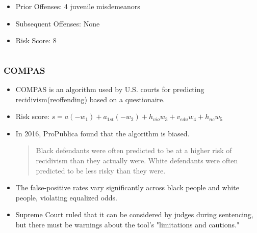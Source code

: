 \documentclass{beamer}
\begin{document}
\begin{frame}
\begin{columns}[T]
\begin{column}{.5\textwidth}
            \footnotesize
            \begin{itemize}
                \item Prior Offenses: 4 juvenile misdemeanors
                \item Subsequent Offenses: None
                \item Risk Score: 8
            \end{itemize}
        \end{column}
    \end{columns}
\end{frame}

\begin{frame}
    \frametitle{COMPAS}
    \begin{itemize}
        \item COMPAS is an algorithm
        used by U.S. courts for predicting recidivism(reoffending) based on a
        questionaire.
        \item Risk score: $s =  a(-w_1) + a_{1st} (-w_2) + h_{vio} w_3 + v_{edu} w_4 + h_{nc} w_5$
        \item In 2016, ProPublica found that the algorithm is biased.
        \begin{quote}
            Black defendants were often predicted to be at a higher risk of recidivism than they actually were.
            White defendants were often predicted to be less risky than they were.
        \end{quote}
        \item The false-positive rates vary significantly across
        black people and white people, violating equalized odds.
        \item Supreme Court ruled that it can be considered by judges during
        sentencing, but there must be warnings about the tool's "limitations and cautions."
    \end{itemize}
\end{frame}
\end{document}
